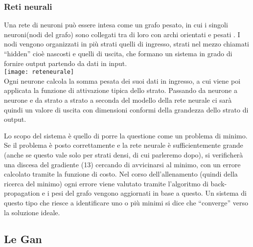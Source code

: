\subsubsection{Reti neurali}
Una rete di neuroni  può essere intesa come un grafo pesato, in cui i singoli neuroni(nodi del grafo) sono collegati tra di loro con archi orientati e pesati . I nodi vengono organizzati in più strati quelli di  ingresso, strati  nel mezzo chiamati  “hidden” cioè nascosti e quelli di uscita, che formano un sistema in grado di fornire output partendo da  dati in input.\\
\texttt{[image: reteneurale]}\\
Ogni neurone calcola la somma pesata dei suoi dati in ingresso, a cui viene poi applicata la funzione di attivazione  tipica dello strato. Passando da neurone a neurone e da strato a strato a seconda del modello della rete neurale ci sarà quindi un valore di uscita con  dimensioni conformi della grandezza dello strato di output.


Lo scopo del sistema è quello di porre la questione come un problema di minimo. Se il problema è posto correttamente e la rete neurale è sufficientemente grande (anche se questo vale solo per strati densi, di cui parleremo dopo), si verificherà una discesa del gradiente (13) cercando di avvicinarsi al minimo, con un errore calcolato tramite la funzione di costo. Nel corso dell’allenamento (quindi della ricerca del minimo) ogni errore viene valutato tramite l’algoritmo di back-propagation e i pesi del grafo vengono aggiornati in base a questo. Un sistema di questo tipo che riesce a identificare uno o più minimi si dice che “converge” verso la soluzione ideale.

\subsection{Le Gan}


